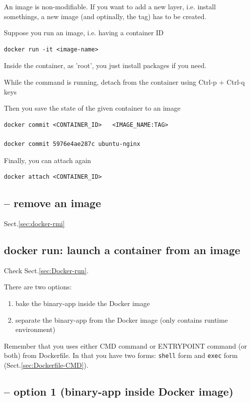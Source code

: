 An image is non-modifiable. If you want to add a new layer, i.e. install
somethings, a new image (and optinally, the tag) has to be created.

Suppose you run an image, i.e. having a container ID
\begin{verbatim}
docker run -it <image-name>  
\end{verbatim}


Inside the container, as 'root', you just install packages if you need.


While the command is running, detach from the container using Ctrl-p + Ctrl-q keys 

Then you save the state of the given container to an image
\begin{verbatim}
docker commit <CONTAINER_ID>   <IMAGE_NAME:TAG>

docker commit 5976e4ae287c ubuntu-nginx
\end{verbatim}


Finally, you can attach again
\begin{verbatim}
docker attach <CONTAINER_ID>
\end{verbatim}

\subsection{-- remove an image}

Sect.\ref{sec:docker-rmi}

\subsection{docker run: launch a container from an image}
\label{sec:docker-run-command}

Check Sect.\ref{sec:Docker-run}.


There are two options: 
\begin{enumerate}
  \item bake the binary-app inside the Docker image
  
  \item separate the binary-app from the Docker image (only contains runtime environment)
\end{enumerate}


Remember that you uses either CMD command or ENTRYPOINT command (or both) from Dockerfile.
In that you have two forms: \verb!shell! form and \verb!exec! form (Sect.\ref{sec:Dockerfile-CMD}).


\subsection{-- option 1 (binary-app inside Docker image)}


